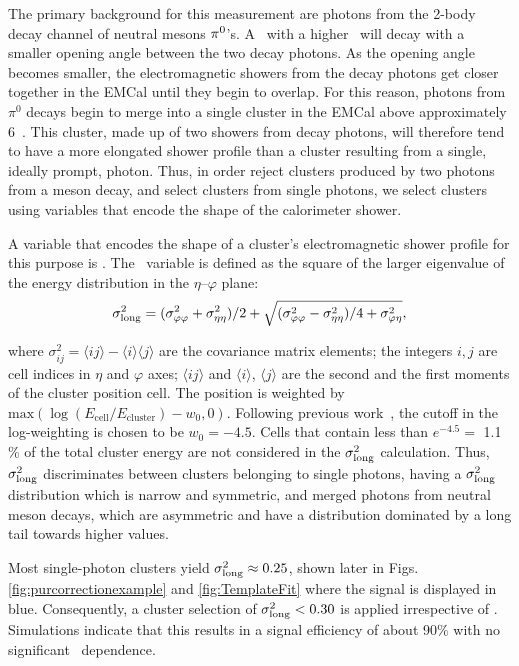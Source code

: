 The primary background for this measurement are photons from the 2-body decay channel of neutral mesons $\pi^0$'s. A \pizero~with a higher \pt~will decay  with a smaller opening angle between the two decay photons. As the opening angle becomes smaller, the electromagnetic showers from the decay photons get closer together in the EMCal until they begin to overlap. For this reason, photons from $\pi^0$ decays begin to merge into a single cluster in the EMCal above approximately 6~\GeVc. This cluster, made up of two showers from decay photons, will therefore tend to have a more elongated shower profile than a cluster resulting from a single, ideally prompt, photon. Thus, in order reject clusters produced by two photons from a meson decay, and select clusters from single photons, we select clusters using variables that encode the shape of the calorimeter shower. 

A variable that encodes the shape of a cluster's electromagnetic shower profile for this purpose is \lambdasquare. 
The \lambdasquare~variable is defined as the square of the larger eigenvalue of the energy distribution in the $\eta$--$\varphi$ plane:
\begin{equation}
\sigma^{2}_{\mathrm{long}} = (\sigma^{2}_{\varphi\varphi} + \sigma^{2}_{\eta\eta})/2 + \sqrt{(\sigma^{2}_{\varphi\varphi} - \sigma^{2}_{\eta\eta})/4 + \sigma^{2}_{\varphi\eta}},
\end{equation}

where $\sigma^{2}_{ij} = \langle ij \rangle - \langle i \rangle\langle j \rangle$ are the covariance matrix elements; the integers $i,j$ are cell indices in $\eta$ and  $\varphi$ axes; $\langle ij \rangle$ and $\langle i\rangle$, $\langle j\rangle$ are the second and the first moments of the cluster position cell. The position is weighted by $\mathrm{max}\left(\log(E_{\mathrm{cell}}/E_{\mathrm{cluster}}) - w_{0},0\right).$ Following previous work~\cite{Acharya:2018dqe}, the cutoff in the log-weighting is chosen to be $w_{0}=-4.5$. Cells that contain less than {$e^{-4.5} =$ 1.1$\%$} of the total cluster energy are not considered in the $\sigma^{2}_{\mathrm{long}}$ calculation. Thus, $\sigma^{2}_{\mathrm{long}}$ discriminates between clusters belonging to single photons, having a $\sigma^{2}_{\mathrm{long}}$ distribution which is narrow and symmetric, and merged photons from neutral meson decays, which are asymmetric and have a distribution dominated by a long tail towards higher values. 

Most single-photon clusters yield $\sigma^{2}_{\mathrm{long}}\approx 0.25$, shown later in Figs. \ref{fig:purcorrectionexample} and \ref{fig:TemplateFit} where the signal is displayed in blue. Consequently, a cluster selection of $\sigma^{2}_{\mathrm{long}}<0.30$ is applied irrespective of \pt. Simulations indicate that this results in a signal efficiency of about 90$\%$ with no significant \pt~dependence.


